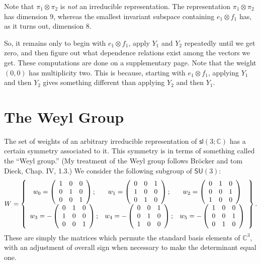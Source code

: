 \documentclass{amsbook}
\theoremstyle{plain}
\numberwithin{equation}{chapter}
\numberwithin{theorem}{chapter}
\begin{document}
Note that $\pi_{1}\otimes\pi_{2}$ is \textit{not} an irreducible
representation. The representation $\pi_{1}\otimes\pi_{2}$ has dimension 9,
whereas the smallest invariant subspace containing $e_{1}\otimes f_{1}$ has,
as it turns out, dimension 8.

So, it remains only to begin with $e_{1}\otimes f_{1}$, apply $Y_{1}$ and
$Y_{2}$ repeatedly until we get zero, and then figure out what dependence
relations exist among the vectors we get. These computations are done on a
supplementary page. Note that the weight $\left(  0,0\right)  $ has
multiplicity two. This is because, starting with $e_{1}\otimes f_{1}$,
applying $Y_{1}$ and then $Y_{2}$ gives something different than applying
$Y_{2}$ and then $Y_{1}$.

\section{The Weyl Group}

The set of weights of an arbitrary irreducible representation of
$\mathsf{sl}\left(  3;\mathbb{C}\right)  $ has a certain symmetry associated
to it. This symmetry is in terms of something called the ``Weyl group.'' (My
treatment of the Weyl group follows Br\"ocker and tom Dieck, Chap. IV, 1.3.)
We consider the following subgroup of $\mathsf{SU}(3)$:
\[
W=\left\{
\begin{array}
[c]{ccc}%
w_{0}=\left(
\begin{array}
[c]{ccc}%
1 & 0 & 0\\
0 & 1 & 0\\
0 & 0 & 1
\end{array}
\right)  ; & w_{1}=\left(
\begin{array}
[c]{ccc}%
0 & 0 & 1\\
1 & 0 & 0\\
0 & 1 & 0
\end{array}
\right)  ; & w_{2}=\left(
\begin{array}
[c]{ccc}%
0 & 1 & 0\\
0 & 0 & 1\\
1 & 0 & 0
\end{array}
\right) \\
w_{3}=-\left(
\begin{array}
[c]{ccc}%
0 & 1 & 0\\
1 & 0 & 0\\
0 & 0 & 1
\end{array}
\right)  ; & w_{4}=-\left(
\begin{array}
[c]{ccc}%
0 & 0 & 1\\
0 & 1 & 0\\
1 & 0 & 0
\end{array}
\right)  ; & w_{5}=-\left(
\begin{array}
[c]{ccc}%
1 & 0 & 0\\
0 & 0 & 1\\
0 & 1 & 0
\end{array}
\right)
\end{array}
\right\}  \text{.}%
\]
These are simply the matrices which permute the standard basis elements of
$\mathbb{C}^{3}$, with an adjustment of overall sign when necessary to make
the determinant equal one.
\end{document}
